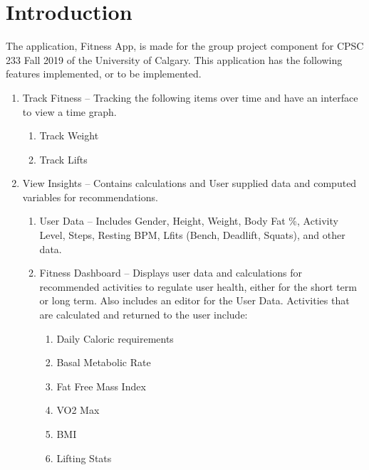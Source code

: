\documentclass[../Documentation.tex]{subfiles}
\begin{document}
\section{Introduction}
The application, Fitness App, is made for the group project component for CPSC 233 Fall 2019 of the University of Calgary. This application has the following features implemented, or to be implemented.
\begin{enumerate}
	\item Track Fitness -- Tracking the following items over time and have an interface to view a time graph.
	\begin{enumerate}
		\item Track Weight
		\item Track Lifts
	\end{enumerate}
	\item View Insights -- Contains calculations and User supplied data and computed variables for recommendations. 
	\begin{enumerate}
		\item User Data -- Includes Gender, Height, Weight, Body Fat \%, Activity Level, Steps, Resting BPM, Lfits (Bench, Deadlift, Squats), and other data.
		\item Fitness Dashboard -- Displays user data and calculations for recommended activities to regulate user health, either for the short term or long term. Also includes an editor for the User Data. Activities that are calculated and returned to the user include:
		\begin{enumerate}
			\item Daily Caloric requirements
			\item Basal Metabolic Rate
			\item Fat Free Mass Index
			\item VO2 Max
			\item BMI
			\item Lifting Stats
		\end{enumerate}
	\end{enumerate}
\end{enumerate}
\end{document}

